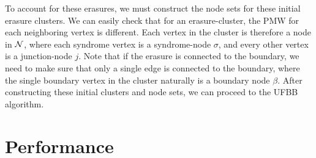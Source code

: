 To account for these erasures, we must construct the node sets for these initial erasure clusters. We can easily check that for an erasure-cluster, the PMW for each neighboring vertex is different. Each vertex in the cluster is therefore a node in $\mathcal{N}$, where each syndrome vertex is a syndrome-node $\sigma$, and every other vertex is a junction-node $j$. Note that if the erasure is connected to the boundary, we need to make sure that only a single edge is connected to the boundary, where the single boundary vertex in the cluster naturally is a boundary node $\beta$. After constructing these initial clusters and node sets, we can proceed to the UFBB algorithm.  

\section{Performance}